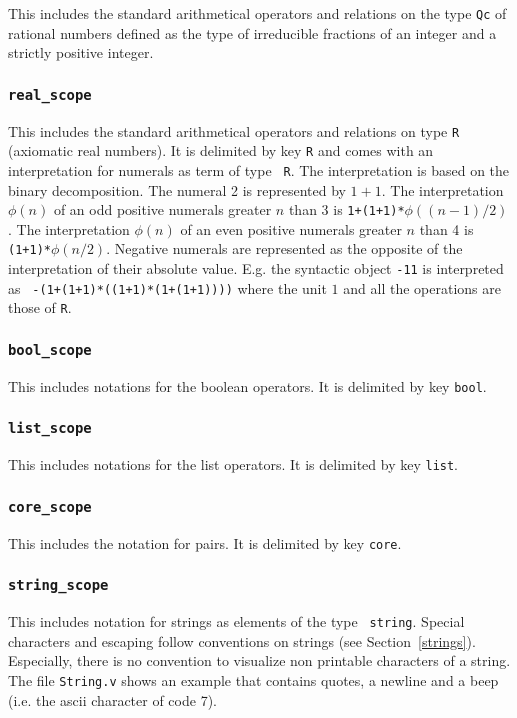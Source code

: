 This includes the standard arithmetical operators and relations on the
type {\tt Qc} of rational numbers defined as the type of irreducible
fractions of an integer and a strictly positive integer.

\subsubsection{\tt real\_scope}

This includes the standard arithmetical operators and relations on
type {\tt R} (axiomatic real numbers). It is delimited by key {\tt R}
and comes with an interpretation for numerals as term of type {\tt
R}. The interpretation is based on the binary decomposition.  The
numeral 2 is represented by $1+1$.  The interpretation $\phi(n)$ of an
odd positive numerals greater $n$ than 3 is {\tt 1+(1+1)*$\phi((n-1)/2)$}.
The interpretation $\phi(n)$ of an even positive numerals greater $n$
than 4 is {\tt (1+1)*$\phi(n/2)$}.  Negative numerals are represented as the
opposite of the interpretation of their absolute value. E.g. the
syntactic object {\tt -11} is interpreted as {\tt
-(1+(1+1)*((1+1)*(1+(1+1))))} where the unit $1$ and all the operations are
those of {\tt R}.

\subsubsection{\tt bool\_scope}

This includes notations for the boolean operators. It is
delimited by key {\tt bool}.

\subsubsection{\tt list\_scope}

This includes notations for the list operators. It is
delimited by key {\tt list}.

\subsubsection{\tt core\_scope}

This includes the notation for pairs. It is delimited by key {\tt core}.

\subsubsection{\tt string\_scope}

This includes notation for strings as elements of the type {\tt
string}.  Special characters and escaping follow {\Coq} conventions
on strings (see Section~\ref{strings}). Especially, there is no
convention to visualize non printable characters of a string.  The
file {\tt String.v} shows an example that contains quotes, a newline
and a beep (i.e. the ascii character of code 7).

